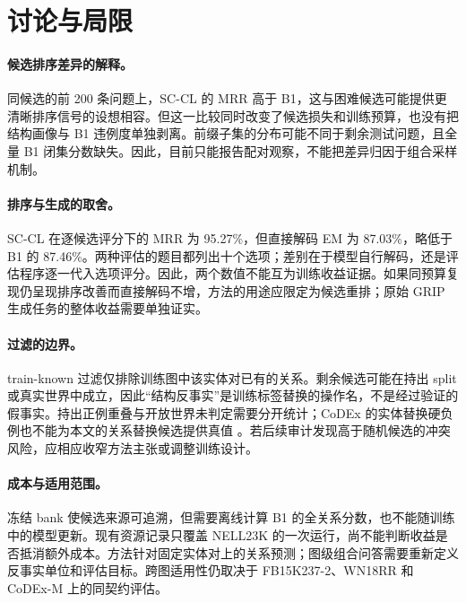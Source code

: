 \section{讨论与局限}

\paragraph{候选排序差异的解释。}
同候选的前 200 条问题上，SC-CL 的 MRR 高于 B1，这与困难候选可能提供更清晰排序信号的设想相容。但这一比较同时改变了候选损失和训练预算，也没有把结构画像与 B1 违例度单独剥离。前缀子集的分布可能不同于剩余测试问题，且全量 B1 闭集分数缺失。因此，目前只能报告配对观察，不能把差异归因于组合采样机制。

\paragraph{排序与生成的取舍。}
SC-CL 在逐候选评分下的 MRR 为 95.27\%，但直接解码 EM 为 87.03\%，略低于 B1 的 87.46\%。两种评估的题目都列出十个选项；差别在于模型自行解码，还是评估程序逐一代入选项评分。因此，两个数值不能互为训练收益证据。如果同预算复现仍呈现排序改善而直接解码不增，方法的用途应限定为候选重排；原始 GRIP 生成任务的整体收益需要单独证实。

\paragraph{过滤的边界。}
train-known 过滤仅排除训练图中该实体对已有的关系。剩余候选可能在持出 split 或真实世界中成立，因此“结构反事实”是训练标签替换的操作名，不是经过验证的假事实。持出正例重叠与开放世界未判定需要分开统计；CoDEx 的实体替换硬负例也不能为本文的关系替换候选提供真值 \citep{safavi2020codex}。若后续审计发现高于随机候选的冲突风险，应相应收窄方法主张或调整训练设计。

\paragraph{成本与适用范围。}
冻结 bank 使候选来源可追溯，但需要离线计算 B1 的全关系分数，也不能随训练中的模型更新。现有资源记录只覆盖 NELL23K 的一次运行，尚不能判断收益是否抵消额外成本。方法针对固定实体对上的关系预测；图级组合问答需要重新定义反事实单位和评估目标。跨图适用性仍取决于 FB15K237-2、WN18RR 和 CoDEx-M 上的同契约评估。
